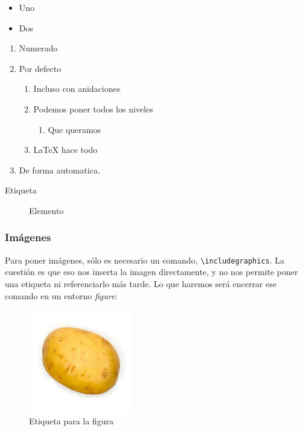 \begin{LTXexample}[pos=r]
\begin{itemize}
\item Uno
\item Dos
\end{itemize}

\begin{enumerate}
\item Numerado
\item Por defecto
\begin{enumerate}
\item Incluso con anidaciones
\item Podemos poner todos los niveles
\begin{enumerate}
\item Que queramos
\end{enumerate}
\item \LaTeX{} hace todo
\end{enumerate}
\item De forma automatica.
\end{enumerate}

\begin{description}
\item[Etiqueta] Elemento
\end{description}
\end{LTXexample}

\subsubsection{Imágenes}
\label{sec:Imagenes}

Para poner imágenes, sólo es necesario un comando, \verb|\includegraphics|. La cuestión es que eso nos inserta la imagen directamente, y no nos permite poner una etiqueta ni referenciarlo más tarde. Lo que haremos será encerrar ese comando en un entorno \textit{figure}:

\begin{LTXexample}[pos=r]
\begin{figure}[hbtp]
\centering
\includegraphics[width=0.4\textwidth]{Patata.jpg}
\caption{Etiqueta para la figura}
\label{fig:FiguraEjemplo}
\end{figure}
\end{LTXexample}

